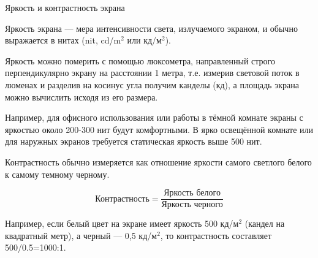 \documentclass{beamer}
\begin{document}
	\begin{frame}{Яркость и контрастность экрана}

		Яркость экрана --- мера интенсивности света, излучаемого экраном, и обычно выражается в нитах (nit, cd/m$^2$ или кд/м$^2$). \\
		
		{\footnotesize
			Яркость можно померить с помощью люксометра, направленный строго перпендикулярно экрану на расстоянии 1 метра, т.е. измерив световой поток в люменах и разделив на косинус угла получим канделы (кд), а площадь экрана можно вычислить исходя из его размера.
			
			Например, для офисного использования или работы в тёмной комнате экраны с яркостью около 200-300 нит будут комфортными. 
			В ярко освещённой комнате или для наружных экранов требуется статическая яркость выше 500 нит.
		}
		Контрастность обычно измеряется как отношение яркости самого светлого белого к самому темному черному.

		\[
			\text{Контрастность} = \frac{\text{Яркость белого}}{\text{Яркость черного}}
		\]

		{\footnotesize
		Например, если белый цвет на экране имеет яркость 500 кд/м$^2$ (кандел на квадратный метр), а черный --- 0,5 кд/м$^2$, то контрастность составляет 500/0.5=1000:1.
		}
	\end{frame}
\end{document}
